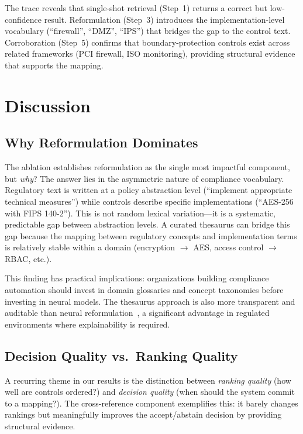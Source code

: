 \documentclass{sn-jnl}
\begin{document}
The trace reveals that single-shot retrieval (Step~1) returns a correct but low-confidence result.
Reformulation (Step~3) introduces the implementation-level vocabulary (``firewall'', ``DMZ'', ``IPS'') that bridges the gap to the control text.
Corroboration (Step~5) confirms that boundary-protection controls exist across related frameworks (PCI firewall, ISO monitoring), providing structural evidence that supports the mapping.


\section{Discussion}
\label{sec:discussion}

\subsection{Why Reformulation Dominates}

The ablation establishes reformulation as the single most impactful component, but \emph{why}?
The answer lies in the asymmetric nature of compliance vocabulary.
Regulatory text is written at a policy abstraction level (``implement appropriate technical measures'') while controls describe specific implementations (``AES-256 with FIPS 140-2'').
This is not random lexical variation---it is a systematic, predictable gap between abstraction levels.
A curated thesaurus can bridge this gap because the mapping between regulatory concepts and implementation terms is relatively stable within a domain (encryption $\rightarrow$ AES, access control $\rightarrow$ RBAC, etc.).

This finding has practical implications: organizations building compliance automation should invest in domain glossaries and concept taxonomies before investing in neural models.
The thesaurus approach is also more transparent and auditable than neural reformulation~\cite{Nogueira2019}, a significant advantage in regulated environments where explainability is required.

\subsection{Decision Quality vs.\ Ranking Quality}

A recurring theme in our results is the distinction between \emph{ranking quality} (how well are controls ordered?) and \emph{decision quality} (when should the system commit to a mapping?).
The cross-reference component exemplifies this: it barely changes rankings but meaningfully improves the accept/abstain decision by providing structural evidence.
\end{document}
